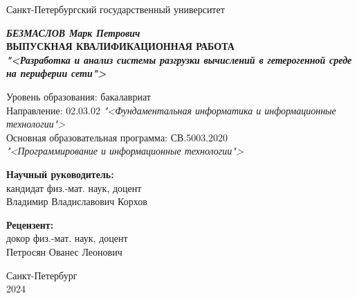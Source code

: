 \thispagestyle{empty}

\begin{center}
    Санкт-Петербургский государственный университет \\
\end{center}

    
\vfill

\begin{center}
    \textbf{ 
    \textit{БЕЗМАСЛОВ Марк Петрович} \\ 
    \vspace{20pt}
    ВЫПУСКНАЯ КВАЛИФИКАЦИОННАЯ РАБОТА  \\  
    \vspace{20pt}
     \textit{"<Разработка и анализ системы разгрузки вычислений в гетерогенной среде на периферии сети">}
     }

    \vspace{40pt}

\end{center}

\begin{center}
\vspace{20pt}
    Уровень образования: бакалавриат \\
    Направление: 02.03.02 
    \textit{"<Фундаментальная информатика и информационные технологии">} \\
    Основная образовательная программа: СВ.5003.2020 \\
    \textit{"<Программирование и информационные технологии">}
\end{center}

\vfill

\begin{flushright}

    \noindent \textbf{Научный руководитель:} \\ кандидат физ.-мат. наук, доцент \\ Владимир Владиславович Корхов \\ 

    \vspace{20pt}
    
    \noindent \textbf{Рецензент:} \\ докор физ.-мат. наук, доцент \\ Петросян Ованес Леонович \\
\end{flushright}

\vfill


\begin{center}
    Санкт-Петербург \\ 2024
\end{center}

\newpage